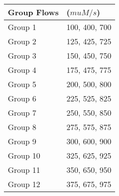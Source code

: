 \documentclass[letterpaper,10pt,english]{sphinxmanual}
\begin{document}
\begin{savenotes}\sphinxattablestart
\centering
{}
\label{\detokenize{Gas_Transfer/Gas_Transfer:id8}}\label{\detokenize{Gas_Transfer/Gas_Transfer:table-air-flow-rates}}
\sphinxaftercaption
\begin{tabulary}{\linewidth}[t]{|T|T|}
\hline
\sphinxstyletheadfamily 
Group       Flows
&\sphinxstyletheadfamily 
(\(mu M/s\))
\\
\hline
Group 1
&
100, 400, 700
\\
\hline
Group 2
&
125, 425, 725
\\
\hline
Group 3
&
150, 450, 750
\\
\hline
Group 4
&
175, 475, 775
\\
\hline
Group 5
&
200, 500, 800
\\
\hline
Group 6
&
225, 525, 825
\\
\hline
Group 7
&
250, 550, 850
\\
\hline
Group 8
&
275, 575, 875
\\
\hline
Group 9
&
300, 600, 900
\\
\hline
Group 10
&
325, 625, 925
\\
\hline
Group 11
&
350, 650, 950
\\
\hline
Group 12
&
375, 675, 975
\\
\hline
\end{tabulary}
\par
\sphinxattableend\end{savenotes}
\end{document}
